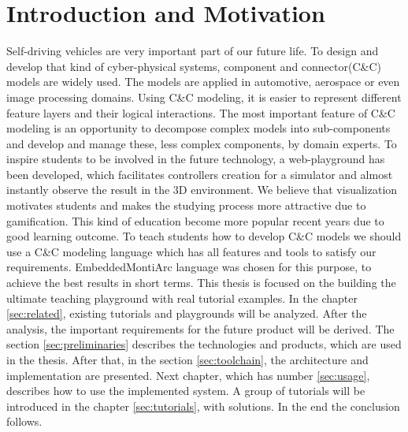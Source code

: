 \setlength{\parindent}{3ex}
\setlength{\parskip}{0ex}

\chapter{Introduction and Motivation}
Self-driving vehicles are very important part of our future life. To design and develop that kind of cyber-physical systems, component and connector(C\&C) models are widely used. The models are applied in automotive, aerospace or even image processing domains. Using C\&C modeling, it is easier to represent different feature layers and their logical interactions. The most important feature of C\&C modeling is an opportunity to decompose complex models into sub-components and develop and manage these, less complex components, by domain experts.\newline
To inspire students to be involved in the future technology, a web-playground has been developed, which facilitates controllers creation for a simulator and almost instantly observe the result in the 3D environment. We believe that visualization motivates students and makes the studying process more attractive due to gamification. This kind of education become more popular recent years due to good learning outcome\cite{Game}.\newline
To teach students how to develop C\&C models we should use a C\&C modeling language which has all features and tools to satisfy our requirements. EmbeddedMontiArc \cite{HR17} language was chosen for this purpose, to achieve the best results in short terms.\newline
This thesis is focused on the building the ultimate teaching playground with real tutorial examples. In the chapter \ref{sec:related}, existing tutorials and playgrounds will be analyzed. After the analysis, the important requirements for the future product will be derived. The section \ref{sec:preliminaries} describes the technologies and products, which are used in the thesis. After that, in the section \ref{sec:toolchain}, the architecture and implementation are presented. Next chapter, which has number \ref{sec:usage}, describes how to use the implemented system. A group of tutorials will be introduced in the chapter \ref{sec:tutorials}, with solutions. In the end the conclusion follows.
\cleardoublepage

